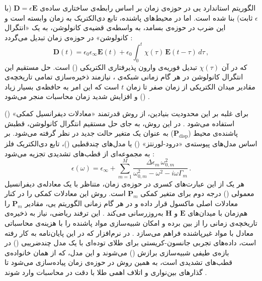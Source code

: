 \documentclass[12pt,a4paper]{report}
\newcommand{\sub}[1]{\mathrm{#1}}               %
\begin{document}
الگوریتم استاندارد یی در حوزه‌ی زمان بر اساس رابطه‌ی ساختاری ساده‌ی $\mathbf{D}=\epsilon\mathbf{E}$ (با $\epsilon$ ثابت) بنا شده است. اما در محیط‌های پاشنده، تابع دی‌الکتریک به زمان وابسته است و این ضرب در حوزه‌ی بسامد، به واسطه‌ی قضیه‌ی کانولوشن، به یک «انتگرال کانولوشن» در حوزه‌ی زمان تبدیل می‌گردد \cite{taflove}:
\begin{equation}
\mathbf{D}(t)=\epsilon_0\epsilon_\infty\mathbf{E}(t)+\epsilon_0\int_0^t\chi(\tau)\,\mathbf{E}(t-\tau)\,d\tau\,,
\end{equation}
که در آن $\chi(\tau)$ تبدیل فوریه‌ی وارون پذیرفتاری الکتریکی () است. حل مستقیم این انتگرال کانولوشن در هر گام زمانی شبکه‌ی ، نیازمند ذخیره‌سازی تمامی تاریخچه‌ی مقادیر میدان الکتریکی از زمان صفر تا زمان $t$ است که این امر به حافظه‌ی بسیار زیاد () و افزایش شدید زمان محاسبات منجر می‌شود \cite{taflove}.

برای غلبه بر این محدودیت بنیادین، از روش قدرتمند «معادلات دیفرانسیل کمکی» () استفاده می‌شود \cite{taflove}. در این روش، به جای حل مستقیم انتگرال کانولوشن، قطبش پاشنده‌ی محیط ($\mathbf{P}_{\sub{disp}}$) به عنوان یک متغیر حالت جدید در نظر گرفته می‌شود. بر اساس مدل‌های پیوسته‌ی «درود-لورنتز» () یا مدل‌های چندقطبی ()، تابع دی‌الکتریک فلز به مجموعه‌ای از قطب‌های تشدیدی تجزیه می‌شود \cite{taflove,maier}:
\begin{equation}
\epsilon(\omega)=\epsilon_\infty+\sum_{m=1}^{M}\frac{\Delta\epsilon_m\,\omega_{0,m}^2}{\omega_{0,m}^2-\omega^2-i\omega\Gamma_m}\,.
\end{equation}
هر یک از این عبارت‌های کسری در حوزه‌ی زمان، متناظر با یک معادله‌ی دیفرانسیل معمولی () درجه دوم برای متغیر کمکی $\mathbf{P}_m$ است. روش  این معادلات کمکی را در کنار معادلات اصلی ماکسول قرار داده و در هر گام زمانی الگوریتم یی، مقادیر $\mathbf{P}_m$ را هم‌زمان با میدان‌های $\mathbf{E}$ و $\mathbf{H}$ به‌روزرسانی می‌کند \cite{taflove}. این ترفند ریاضی، نیاز به ذخیره‌ی تاریخچه‌ی زمانی را از بین برده و امکان شبیه‌سازی مواد پاشنده را با هزینه‌ی محاسباتی معادل با مواد غیرپاشنده فراهم می‌سازد \cite{taflove}. در نرم‌افزار  که در این پایان‌نامه به کار رفته است، داده‌های تجربی جانسون-کریستی \cite{jc} برای طلای توده‌ای با یک مدل چندضریبی () در بازه‌ی طیفی شبیه‌سازی برازش () می‌شوند و این مدل، که از همان خانواده‌ی قطب‌های تشدیدی است، به همین روش در حوزه‌ی زمان پیاده‌سازی می‌شود تا گذارهای بین‌نواری و اتلاف اهمی طلا با دقت در محاسبات وارد شوند \cite{jc,taflove}.
\end{document}

